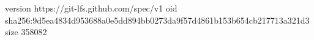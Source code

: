 version https://git-lfs.github.com/spec/v1
oid sha256:9d5ea4834d953688a0e5dd894bb0273da9f57d4861b153b654cb217713a321d3
size 358082
